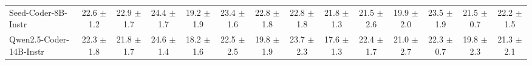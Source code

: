 \begin{table}[hbt]
{\begin{tabular}{l *{13}{c}}
\rowcolor{gray!10}
Seed-Coder-8B-Instr &
22.6 {\tiny$\pm$ 1.2} &
22.9 {\tiny$\pm$ 1.7} &
24.4 {\tiny$\pm$ 1.7} &
19.2 {\tiny$\pm$ 1.9} &
23.4 {\tiny$\pm$ 1.6} &
22.8 {\tiny$\pm$ 1.8} &
22.8 {\tiny$\pm$ 1.8} &
21.8 {\tiny$\pm$ 1.3} &
21.5 {\tiny$\pm$ 2.6} &
19.9 {\tiny$\pm$ 2.0} &
23.5 {\tiny$\pm$ 1.9} &
21.5 {\tiny$\pm$ 0.7} &
22.2 {\tiny$\pm$ 1.5} \\














Qwen2.5-Coder-14B-Instr &
22.3 {\tiny$\pm$ 1.8} &
21.8 {\tiny$\pm$ 1.7} &
24.6 {\tiny$\pm$ 1.4} &
18.2 {\tiny$\pm$ 1.6} &
22.5 {\tiny$\pm$ 2.5} &
19.8 {\tiny$\pm$ 1.9} &
23.7 {\tiny$\pm$ 2.3} &
17.6 {\tiny$\pm$ 1.3} &
22.4 {\tiny$\pm$ 1.7} &
21.0 {\tiny$\pm$ 2.7} &
22.3 {\tiny$\pm$ 0.7} &
19.8 {\tiny$\pm$ 2.3} &
21.3 {\tiny$\pm$ 2.1} \\


\end{tabular}}
\end{table}
